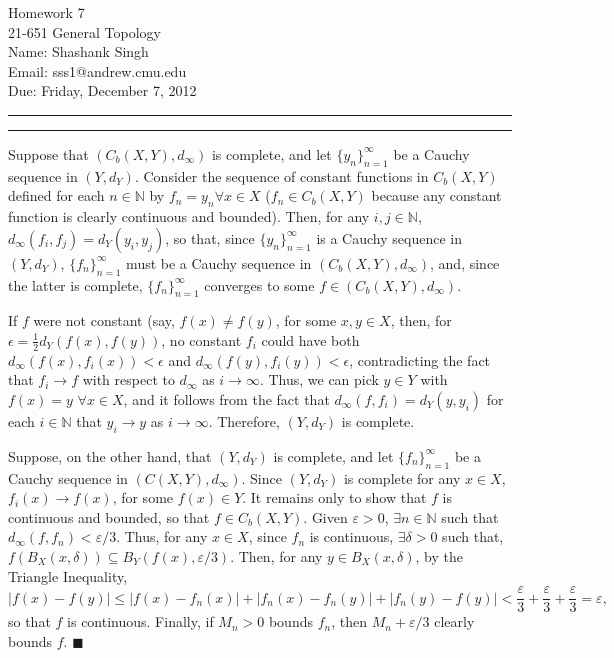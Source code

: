 \documentclass[11pt]{article}
\makeatletter
\newcounter{questionCounter}
\newcounter{partCounter}[questionCounter]
\newenvironment{question}[2][\arabic{questionCounter}]{%
    \setcounter{partCounter}{0}%
    \vspace{.25in} \hrule \vspace{0.5em}%
        \noindent{\bf #2}%
    \vspace{0.8em} \hrule \vspace{.10in}%
    \addtocounter{questionCounter}{1}%
}{}
\newcommand{\myname}{Shashank Singh}
\newcommand{\myandrew}{sss1@andrew.cmu.edu}
\newcommand{\myclass}{21-651 General Topology}
\newcommand{\myhwnum}{7}
\newcommand{\duedate}{Friday, December 7, 2012}
\renewcommand{\qed}{\quad $\blacksquare$}
\newcommand{\N}{\mathbb{N}} %
\newcommand{\e}{\varepsilon} %
\makeatother
\begin{document}
\thispagestyle{plain}

{\Large Homework \myhwnum} \\
\myclass \\
Name: \myname \\
Email: \myandrew \\
Due: \duedate

\begin{question}{Problem 1}
Suppose that $(C_b(X,Y), d_{\infty})$ is complete, and let
$\{y_n\}_{n = 1}^{\infty}$ be a Cauchy sequence in $(Y,d_Y)$. Consider the
sequence of constant functions in $C_b(X,Y)$ defined for each $n \in \N$
by $f_n = y_n \forall x \in X$ ($f_n \in C_b(X,Y)$ because any constant
function is clearly continuous and bounded). Then, for any $i,j \in \N$,
$d_{\infty}(f_i,f_j) = d_Y(y_i,y_j)$, so that, since $\{y_n\}_{n = 1}^{\infty}$
is a Cauchy sequence in $(Y,d_Y)$, $\{f_n\}_{n = 1}^{\infty}$ must be a Cauchy
sequence in $(C_b(X,Y),d_{\infty})$, and, since the latter is complete,
$\{f_n\}_{n = 1}^{\infty}$ converges to some $f \in (C_b(X,Y), d_{\infty})$.

If $f$ were not constant (say, $f(x) \neq f(y)$, for some $x,y \in X$, then,
for $\epsilon = \frac12d_Y(f(x),f(y))$, no constant $f_i$ could have both
$d_{\infty}(f(x),f_i(x)) < \epsilon$ and $d_{\infty}(f(y),f_i(y)) < \epsilon$,
contradicting the fact that $f_i \rightarrow f$ with respect to $d_{\infty}$ as
$i \rightarrow \infty$. Thus, we can pick $y \in Y$ with $f(x) = y$
$\forall x \in X$, and it follows from the fact that
$d_{\infty}(f,f_i) = d_Y(y,y_i)$ for each $i \in \N$ that $y_i \rightarrow y$
as $i \rightarrow \infty$. Therefore, $(Y,d_Y)$ is complete.

Suppose, on the other hand, that $(Y, d_Y)$ is complete, and let
$\{f_n\}_{n = 1}^{\infty}$ be a Cauchy sequence in $(C(X,Y), d_{\infty})$.
Since $(Y,d_Y)$ is complete for any $x \in X$, $f_i(x) \rightarrow f(x)$, for
some $f(x) \in Y$. It remains only to show that $f$ is continuous and bounded,
so that $f \in C_b(X,Y)$. Given $\e > 0$, $\exists n \in \N$ such that $d_{\infty}(f,f_n) <
\e/3$. Thus, for any $x \in X$, since $f_n$ is continuous, $\exists \delta > 0$
such that, $f(B_X(x,\delta)) \subseteq B_Y(f(x),\e/3)$. Then, for any $y \in
B_X(x,\delta)$, by the Triangle Inequality,
\[|f(x) - f(y)|
 \leq |f(x) - f_n(x)| + |f_n(x) - f_n(y)| + |f_n(y) - f(y)|
 < \frac\e3 + \frac\e3 + \frac\e3 = \e,
\]
so that $f$ is continuous. Finally, if $M_n > 0$ bounds $f_n$, then $M_n +
\e/3$ clearly bounds $f$. \qed
\end{question}
\end{document}
